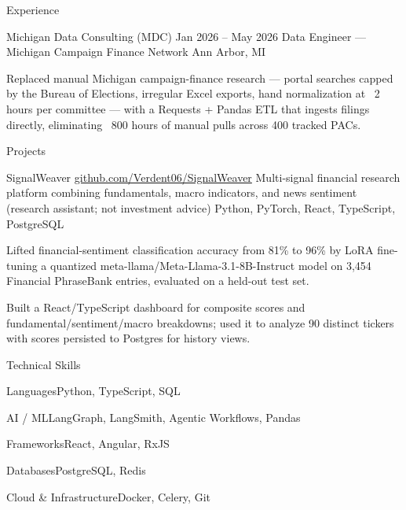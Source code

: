 \documentclass[
	11pt
]{../../../template}
\begin{document}
\begin{rSection}{E}{xperience}
		\begin{rSectionEntry}
			{Michigan Data Consulting (MDC)}
			{Jan 2026 -- May 2026}
			{Data Engineer --- Michigan Campaign Finance Network}
			{}
			{Ann Arbor, MI}

			\item Replaced manual Michigan campaign-finance research --- portal searches capped by the Bureau of Elections, irregular Excel exports, hand normalization at ~2 hours per committee --- with a Requests + Pandas ETL that ingests filings directly, eliminating ~800 hours of manual pulls across 400 tracked PACs.
		\end{rSectionEntry}
	\end{rSection}

	\begin{rSection}{P}{rojects}
		\begin{rSectionEntry}
			{SignalWeaver}
			{\href{https://github.com/Verdent06/SignalWeaver}{github.com/Verdent06/SignalWeaver}}
			{Multi-signal financial research platform combining fundamentals, macro indicators, and news sentiment (research assistant; not investment advice)}
			{Python, PyTorch, React, TypeScript, PostgreSQL}
			{}

			\item Lifted financial-sentiment classification accuracy from 81\% to 96\% by LoRA fine-tuning a quantized meta-llama/Meta-Llama-3.1-8B-Instruct model on 3,454 Financial PhraseBank entries, evaluated on a held-out test set.
			\item Built a React/TypeScript dashboard for composite scores and fundamental/sentiment/macro breakdowns; used it to analyze 90 distinct tickers with scores persisted to Postgres for history views.
		\end{rSectionEntry}
	\end{rSection}

	\begin{rSection}{T}{echnical Skills}
		\begin{rSet}{Languages}{Python, TypeScript, SQL}
		\end{rSet}
		\begin{rSet}{AI / ML}{LangGraph, LangSmith, Agentic Workflows, Pandas}
		\end{rSet}
		\begin{rSet}{Frameworks}{React, Angular, RxJS}
		\end{rSet}
		\begin{rSet}{Databases}{PostgreSQL, Redis}
		\end{rSet}
		\begin{rSet}{Cloud \& Infrastructure}{Docker, Celery, Git}
		\end{rSet}
	\end{rSection}
\end{document}
